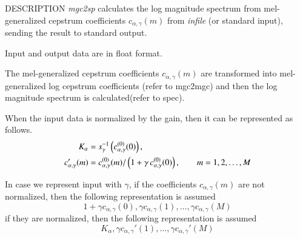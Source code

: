 \begin{qsection}{DESCRIPTION}
{\em mgc2sp} calculates the log magnitude spectrum 
from mel-generalized cepstrum coefficients $c_{\alpha, \gamma}(m)$
from {\em infile} (or standard input),
sending the result to standard output.

Input and output data are in float format.

The mel-generalized cepstrum coefficients $c_{\alpha, \gamma}(m)$
are transformed into mel-generalized log cepstrum coefficients
(refer to mgc2mgc)
and then the log magnitude spectrum is calculated(refer to spec).

When the input data is normalized by the gain,
then it can be represented as follows.
\begin{align}
K_{\alpha} &= 
	s_{\gamma}^{-1}\left(c_{\alpha,\gamma}^{(0)}(0)\right), \notag \\
c_{\alpha,\gamma}'(m) &=
          c_{\alpha,\gamma}^{(0)}(m)/\left(1+\gamma\,
	  c_{\alpha,\gamma}^{(0)}(0)\right), \qquad m = 1,2,\dots, M \notag
\end{align}

In case we represent input with $\gamma$,
if the coefficients $c_{\alpha,\gamma}(m)$ are not normalized, then
the following representation is assumed
\begin{displaymath}
1+\gamma c_{\alpha,\gamma}(0), \gamma c_{\alpha,\gamma}(1), \dots, \gamma c_{\alpha,\gamma}(M)
\end{displaymath}
if they are normalized, then
the following representation is assumed
\begin{displaymath}
K_\alpha,\gamma c_{\alpha,\gamma}'(1),\dots, \gamma c_{\alpha,\gamma}'(M)
\end{displaymath}

\end{qsection}

